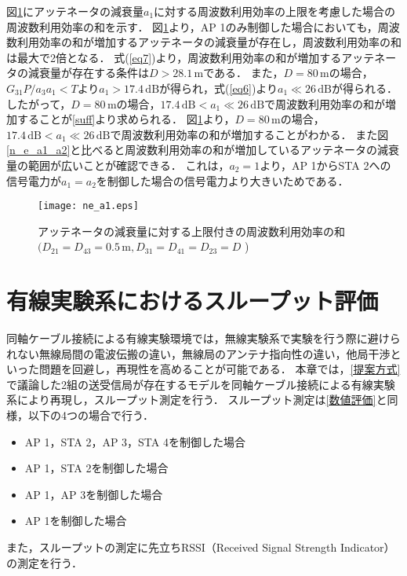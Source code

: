 \documentclass[master]{kuisthesis}		%
\begin{document}
図\ref{n_e_a1}にアッテネータの減衰量$a_1$に対する周波数利用効率の上限を考慮した場合の周波数利用効率の和を示す．
図\ref{n_e_a1}より，AP 1のみ制御した場合においても，周波数利用効率の和が増加するアッテネータの減衰量が存在し，周波数利用効率の和は最大で2倍となる．
式(\ref{eq7})より，周波数利用効率の和が増加するアッテネータの減衰量が存在する条件は$D > 28.1\,\mathrm{m}$である．
また，$D=80\,\mathrm{m}$の場合，$G_{31}P/a_3a_1<T$より$a_1>17.4\,\mathrm{dB}$が得られ，式(\ref{eq6})より$a_1 \ll 26\,\mathrm{dB}$が得られる．
したがって，$D=80\,\mathrm{m}$の場合，$17.4\,\mathrm{dB} < a_1 \ll 26\,\mathrm{dB}$で周波数利用効率の和が増加することが\ref{suff}より求められる．
図\ref{n_e_a1}より，$D=80\,\mathrm{m}$の場合，$17.4\,\mathrm{dB} < a_1 \ll 26\,\mathrm{dB}$で周波数利用効率の和が増加することがわかる．
また図\ref{n_e_a1_a2}と比べると周波数利用効率の和が増加しているアッテネータの減衰量の範囲が広いことが確認できる．
これは，$a_2=1$より，AP 1からSTA 2への信号電力が$a_1=a_2$を制御した場合の信号電力より大きいためである．
\ifnum {}
\begin{figure}[!t]
\centering
\texttt{[image: ne\_a1.eps]}
\caption{アッテネータの減衰量に対する上限付きの周波数利用効率の和   \newline $(D_{21}=D_{43}=0.5\,\mathrm{m},D_{31}=D_{41}=D_{23}=D$ )}
\label{n_e_a1}
\end{figure}
\fi

\section{有線実験系におけるスループット評価} \label{有線実験}          %
同軸ケーブル接続による有線実験環境では，無線実験系で実験を行う際に避けられない無線局間の電波伝搬の違い，無線局のアンテナ指向性の違い，他局干渉といった問題を回避し，再現性を高めることが可能である．
本章では，\ref{提案方式}で議論した2組の送受信局が存在するモデルを同軸ケーブル接続による有線実験系により再現し，スループット測定を行う．
スループット測定は\ref{数値評価}と同様，以下の4つの場合で行う．
\begin{itemize}
\item AP 1，STA 2，AP 3，STA 4を制御した場合
\item AP 1，STA 2を制御した場合
\item AP 1，AP 3を制御した場合
\item AP 1を制御した場合
\end{itemize}
また，スループットの測定に先立ちRSSI（Received Signal Strength Indicator）の測定を行う．
\end{document}
